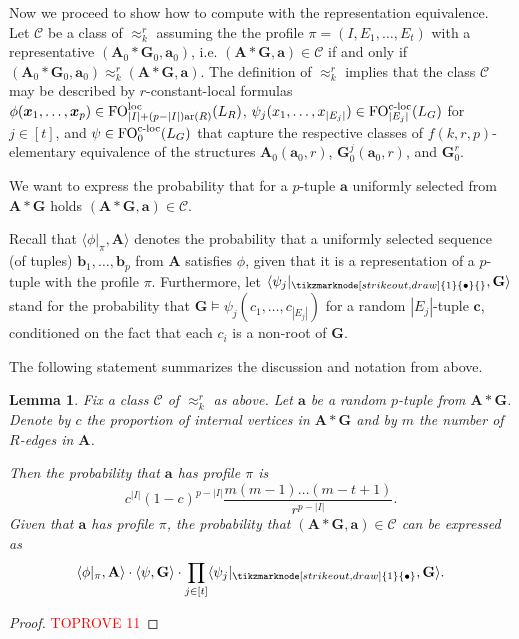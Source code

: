 \documentclass[11pt]{article}
\theoremstyle{plain}
\newtheorem{lemma}[theorem]{Lemma}
\theoremstyle{definition}
\theoremstyle{remark}
\DeclareMathOperator\aritysym{ar}
\newcommand{\arity}[1]{{\aritysym({#1})}}
\DeclareMathOperator\FO{FO}
\newcommand{\FOloc}[1]{\FO_{#1}^\textnormal{loc}}
\newcommand{\FOcloc}[1]{\FO_{#1}^{\textnormal{c-loc}}}
\newcommand{\stonepar}[2]{\langle #1, #2 \rangle}
\newcommand{\str}[1]{\mathbf{#1}}
\newcommand{\tpl}[1]{{\bm{#1}}}
\newcommand{\nonroot}{\tikzmarknode[strike out,draw]{1}{\bullet}}
\begin{document}
Now we proceed to show how to compute with the representation equivalence.
Let $\mathcal{C}$ be a class of $\approx_k^r$ assuming the the profile $\pi = (I,E_1, \dots, E_t)$ with a representative $(\str{A}_0*\str{G}_0, \tpl{a}_0)$, i.e. $(\str{A} * \str{G}, \tpl{a}) \in \mathcal{C}$ if and only if $(\str{A}_0 * \str{G}_0, \tpl{a}_0) \approx_k^r (\str{A} * \str{G}, \tpl{a})$.
The definition of $\approx_k^r$ implies that the class $\mathcal{C}$ may be described by $r$-constant-local formulas $\phi(\tpl{x}_1, \dots, \tpl{x}_p) \in \FOloc{|I|+(p-|I|)\arity{R}}(L_R)$, $\psi_j(x_1, \dots, x_{|E_j|}) \in \FOcloc{|E_j|}(L_G)$ for $j \in [t]$, and $\psi \in \FOcloc{0}(L_G)$ that capture the respective classes of $f(k,r,p)$-elementary equivalence of the structures $\str{A}_0(\tpl{a}_0, r)$, $\str{G}_0^j(\tpl{a}_0, r)$, and $\str{G}^r_0$.


We want to express the probability that for a $p$-tuple $\tpl{a}$ uniformly selected from $\str{A}*\str{G}$ holds $(\str{A}*\str{G}, \tpl{a}) \in \mathcal{C}$.

Recall that $\stonepar{\phi|_\pi}{\str{A}}$ denotes the probability that a uniformly selected sequence (of tuples) $\tpl{b}_1, \dots, \tpl{b}_p$ from $\str{A}$ satisfies $\phi$, given that it is a representation of a $p$-tuple with the profile $\pi$.
Furthermore, let $\stonepar{\psi_j|_{\nonroot{}}}{\str{G}}$ stand for the probability that $\str{G} \models \psi_j(c_1, \dots, c_{|E_j|})$ for a random $|E_j|$-tuple $\tpl{c}$, conditioned on the fact that each $c_i$ is a non-root of $\str{G}$.

The following statement summarizes the discussion and notation from above.

\begin{lemma}\label{lem:representation_statistics_determines_statistics}
    Fix a class $\mathcal{C}$ of $\approx_k^r$ as above.
    Let $\tpl{a}$ be a random $p$-tuple from $\str{A}*\str{G}$.
    Denote by $c$ the proportion of internal vertices in $\str{A}*\str{G}$ and by $m$ the number of $R$-edges in $\str{A}$.
    
    Then the probability that $\tpl{a}$ has profile $\pi$ is   
    \[
        c^{|I|}(1-c)^{p-|I|}\frac{m(m-1)\dots(m-t+1)}{r^{p-|I|}}
        .
    \]
    Given that $\tpl{a}$ has profile $\pi$, the probability that $(\str{A}*\str{G}, \tpl{a}) \in \mathcal{C}$ can be expressed as
    \[
        \stonepar{\phi|_\pi}{\str{A}} \cdot \stonepar{\psi}{\str{G}} \cdot \prod_{j \in [t]} \stonepar{\psi_j|_{\nonroot}}{\str{G}}
        .
    \]
\end{lemma}
\begin{proof}\textcolor{red}{TOPROVE 11}\end{proof}
\end{document}
